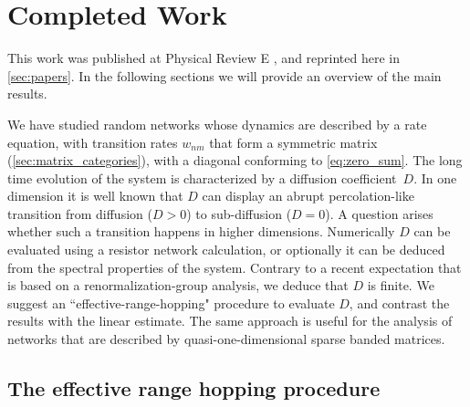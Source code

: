 \chapter{Completed Work}


This work was published at Physical Review E \cite{de_leeuw_diffusion_2012},
and reprinted here in \autoref{sec:papers}. In the
following sections we will provide an overview
of the main results.









We have studied random networks whose dynamics are
described by a rate equation, with transition rates $w_{nm}$
that form a symmetric matrix (\autoref{sec:matrix_categories}),
with a diagonal conforming to \autoref{eq:zero_sum}. 
%
The long time evolution
of the system is characterized by a diffusion coefficient~$D$.
In one dimension it is well known that $D$ can display an abrupt
percolation-like transition from diffusion (${D>0}$)
to sub-diffusion (${D=0}$). 
%
A question arises whether
such a transition happens in higher dimensions.
Numerically $D$ can be evaluated using a resistor network
calculation, or optionally it can be deduced from 
the spectral properties of the system. Contrary to a recent 
expectation that is based on a renormalization-group analysis, 
we deduce that $D$ is finite.
%
We suggest an ``effective-range-hopping" procedure to evaluate $D$,
and contrast the results with the linear estimate.
The same approach is useful for the analysis of 
networks that are described by quasi-one-dimensional  
sparse banded matrices. 


\section{The effective range hopping procedure}


